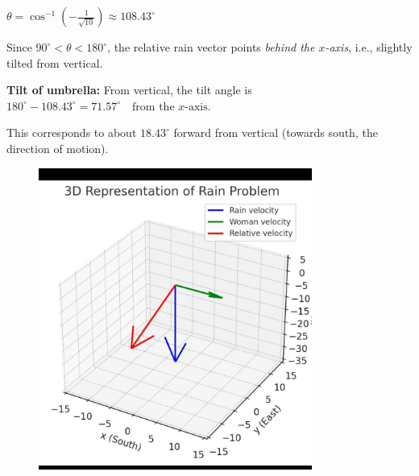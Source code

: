 \documentclass[journal]{IEEEtran}
\begin{document}
$
\theta = \cos^{-1}\!\left(-\tfrac{1}{\sqrt{10}}\right) \approx 108.43^\circ
$

Since $90^\circ < \theta < 180^\circ$,  
the relative rain vector points \emph{behind the $x$-axis}, i.e., slightly tilted from vertical.

\bigskip

\textbf{Tilt of umbrella:}  
From vertical, the tilt angle is
$
180^\circ - 108.43^\circ = 71.57^\circ \quad \text{from the $x$-axis}.
$

This corresponds to about $18.43^\circ$ forward from vertical (towards south, the direction of motion).


\begin{figure}[ht!]
    \centering
    \includegraphics[width=0.8\textwidth]{figs/matgeo-1.2.27.jpeg}
    \caption{}
    \label{fig:1.2.27.jpg}
\end{figure}
\end{document}
